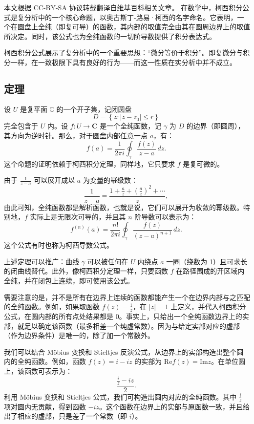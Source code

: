 
本文根据 CC-BY-SA 协议转载翻译自维基百科\href{https://en.wikipedia.org/wiki/Cauchy\%27s_integral_formula}{相关文章}。
在数学中，柯西积分公式是复分析中的一个核心命题，以奥古斯丁-路易·柯西的名字命名。它表明，一个在圆盘上全纯（即复可导）的函数，其内部的取值完全由其在圆周边界上的取值所决定。同时，该公式也为全纯函数的一切阶导数提供了积分表达式。

柯西积分公式展示了复分析中的一个重要思想：“微分等价于积分”。即复微分与积分一样，在一致极限下具有良好的行为——而这一性质在实分析中并不成立。
\subsection{定理}
设 $U$ 是复平面 $\mathbb{C}$ 的一个开子集，记闭圆盘
$$
D = \left\{ z : |z - z_0| \leq r \right\}~
$$
完全包含于 $U$ 内。设 $f: U \to \mathbf{C}$ 是一个全纯函数，记 $\gamma$ 为 $D$ 的边界（即圆周），其方向为逆时针。那么，对于圆盘内部任意一点 $a$，有：
$$
f(a) = \frac{1}{2\pi i} \oint_{\gamma} \frac{f(z)}{z - a} \, dz.~
$$
这个命题的证明依赖于柯西积分定理，同样地，它只要求 $f$ 是复可微的。

由于 $\frac{1}{z - a}$ 可以展开成以 $a$ 为变量的幂级数：
$$
\frac{1}{z - a} = \frac{1 + \frac{a}{z} + \left( \frac{a}{z} \right)^2 + \cdots}{z}  ,~
$$
由此可知，全纯函数都是解析函数，也就是说，它们可以展开为收敛的幂级数。特别地，$f$ 实际上是无限次可导的，并且其 $n$ 阶导数可以表示为：
$$
f^{(n)}(a) = \frac{n!}{2\pi i} \oint_{\gamma} \frac{f(z)}{(z - a)^{n+1}} \, dz.~
$$
这个公式有时也称为柯西导数公式。

上述定理可以推广：曲线 $\gamma$ 可以被任何在 $U$ 内绕点 $a$ 一圈（绕数为 1）且可求长的闭曲线替代。此外，像柯西积分定理一样，只要函数 $f$ 在路径围成的开区域内全纯，并在闭包上连续，即可使用该公式。

需要注意的是，并不是所有在边界上连续的函数都能产生一个在边界内部与之匹配的全纯函数。例如，如果取函数 $f(z) = \frac{1}{z}$，在 $|z| = 1$ 上定义，并代入柯西积分公式，在圆内部的所有点处结果都是 0。事实上，只给出一个全纯函数边界上的实部，就足以确定该函数（最多相差一个纯虚常数）。因为与给定实部对应的虚部（作为边界条件）是唯一的，除了加一个常数外。

我们可以结合 Möbius 变换和 Stieltjes 反演公式，从边界上的实部构造出整个圆内的全纯函数。例如，函数 $f(z) = i - iz$ 的实部为 $\text{Re} f(z) = \text{Im} z$。在单位圆上，该函数可表示为：
$$
\frac{\frac{i}{z} - iz}{2}.~
$$
利用 Möbius 变换和 Stieltjes 公式，我们可构造出圆内对应的全纯函数。其中 $\frac{i}{z}$ 项对圆内无贡献，得到函数 $-iz$。这个函数在边界上的实部与原函数一致，并且给出了相应的虚部，只是差了一个常数（即 $i$）。
